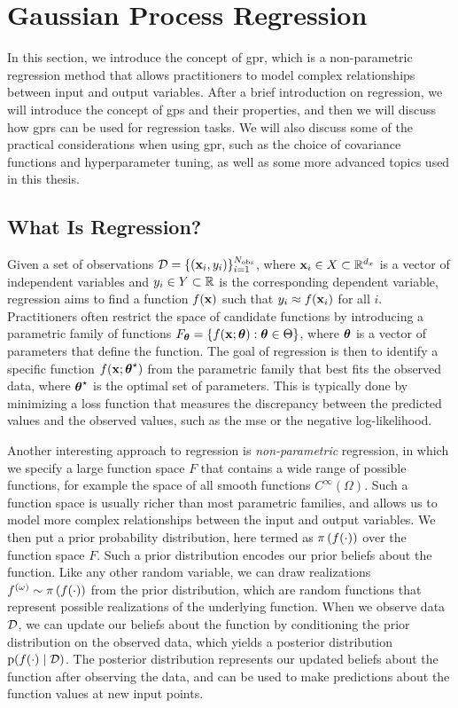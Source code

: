 \section{Gaussian Process Regression}
\label{sec:ntools:gpr}

In this section, we introduce the concept of \gls{gpr}, which is a non-parametric regression method that allows practitioners to model complex relationships between input and output variables. After a brief introduction on regression, we will introduce the concept of \glspl{gp} and their properties, and then we will discuss how \glspl{gpr} can be used for regression tasks. We will also discuss some of the practical considerations when using \gls{gpr}, such as the choice of covariance functions and hyperparameter tuning, as well as some more advanced topics used in this thesis.

\subsection{What Is Regression?}
Given a set of observations $\mathcal{D} = \{(\mathbf{x}_i, y_i)\}_{i=1}^{N_{\mathrm{obs}}}$, where $\mathbf{x}_i \in X \subset \mathbb{R}^{d_x}$ is a vector of independent variables and $y_i \in Y \subset \mathbb{R}$ is the corresponding dependent variable, regression aims to find a function $f(\mathbf{x})$ such that $y_i \approx f(\mathbf{x}_i)$ for all $i$. 
Practitioners often restrict the space of candidate functions by introducing a parametric family of functions $F_{\boldsymbol{\theta}} = \{f(\mathbf{x}; \boldsymbol{\theta}) : \boldsymbol{\theta} \in \Theta\}$, where $\boldsymbol{\theta}$ is a vector of parameters that define the function. The goal of regression is then to identify a specific function $f(\mathbf{x}; \boldsymbol{\theta}^\star)$ from the parametric family that best fits the observed data, where $\boldsymbol{\theta}^\star$ is the optimal set of parameters. This is typically done by minimizing a loss function that measures the discrepancy between the predicted values and the observed values, such as the \gls{mse} or the negative log-likelihood. 

\smallskip
Another interesting approach to regression is \textit{non-parametric} regression, in which we specify a large function space $F$ that contains a wide range of possible functions, for example the space of all smooth functions $C^\infty(\Omega)$. Such a function space is usually richer than most parametric families, and allows us to model more complex relationships between the input and output variables. We then put a prior probability distribution, here termed as $\pi \left( f(\cdot)\right)$ over the function space $F$. Such a prior distribution encodes our prior beliefs about the function. Like any other random variable, we can draw realizations $f^{(\omega)} \sim \pi \left( f(\cdot)\right)$ from the prior distribution, which are random functions that represent possible realizations of the underlying function. When we observe data $\mathcal{D}$, we can update our beliefs about the function by conditioning the prior distribution on the observed data, which yields a posterior distribution $\mathrm{p}(f(\cdot) \mid \mathcal{D})$. The posterior distribution represents our updated beliefs about the function after observing the data, and can be used to make predictions about the function values at new input points.

